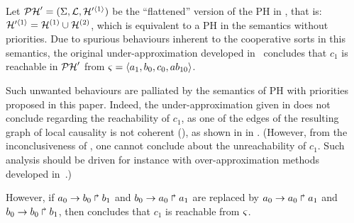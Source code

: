 \begin{example}
  Let $\mathcal{PH}' = (\Sigma, \mathcal{L}, \mathcal{H}'^{\langle 1 \rangle})$ be the “flattened” version of the PH in , that is: $\mathcal{H}'^{\langle 1 \rangle} = \mathcal{H}^{(1)} \cup \mathcal{H}^{(2)}$,
  which is equivalent to a PH in the semantics without priorities.
  Due to spurious behaviours inherent to the cooperative sorts in this semantics, 
  the original under-approximation developed in~\cite{PMR12-MSCS} concludes that $c_1$ is reachable in $\mathcal{PH}'$ from $\varsigma = \mbox{$\langle a_1, b_0, c_0, ab_{10} \rangle$}$.
  
  Such unwanted behaviours are palliated by the semantics of PH with priorities proposed in this paper.
  Indeed, the under-approximation given in  does not conclude regarding the reachability of $c_1$,
  as one of the edges of the resulting graph of local causality is not coherent (),
  as shown in in .
  (However, from the inconclusiveness of , one cannot conclude about the unreachability of $c_1$.
  Such analysis should be driven for instance with over-approximation methods developed in~\cite{PMR12-MSCS}.)
  
  However, if $a_0\rightarrow b_0\Rsh b_1$ and $b_0\rightarrow a_0\Rsh a_1$ are replaced by
  $a_0\rightarrow a_0\Rsh a_1$ and $b_0\rightarrow b_0\Rsh b_1$,
  then  concludes that $c_1$ is reachable from $\varsigma$.
\end{example}

